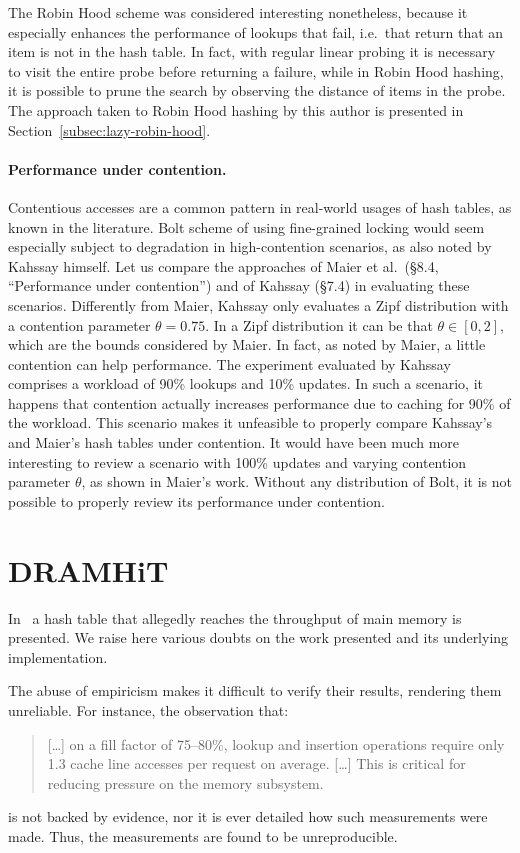 The Robin Hood scheme was considered interesting nonetheless, because it especially enhances the performance of lookups that fail, i.e.\ that return that an item is not in the hash table.
In fact, with regular linear probing it is necessary to visit the entire probe before returning a failure, while in Robin Hood hashing, it is possible to prune the search by observing the distance of items in the probe.
The approach taken to Robin Hood hashing by this author is presented in Section~\ref{subsec:lazy-robin-hood}.

\paragraph{Performance under contention.}
Contentious accesses are a common pattern in real-world usages of hash tables, as known in the literature.
Bolt scheme of using fine-grained locking would seem especially subject to degradation in high-contention scenarios, as also noted by Kahssay himself.
Let us compare the approaches of Maier et al.\ (\S8.4, ``Performance under contention'') and of Kahssay (\S7.4) in evaluating these scenarios.
Differently from Maier, Kahssay only evaluates a Zipf distribution with a contention parameter $\theta = 0.75$.
In a Zipf distribution it can be that $\theta \in [0, 2]$, which are the bounds considered by Maier.
In fact, as noted by Maier, a little contention can help performance.
The experiment evaluated by Kahssay comprises a workload of 90\% lookups and 10\% updates.
In such a scenario, it happens that contention actually increases performance due to caching for 90\% of the workload.
This scenario makes it unfeasible to properly compare Kahssay's and Maier's hash tables under contention.
It would have been much more interesting to review a scenario with 100\% updates and varying contention parameter $\theta$, as shown in Maier's work.
Without any distribution of Bolt, it is not possible to properly review its performance under contention.


\section{DRAMHiT}\label{sec:dramhit}

In~\cite{dramhit} a hash table that allegedly reaches the throughput of main memory is presented.
We raise here various doubts on the work presented and its underlying implementation.

The abuse of empiricism makes it difficult to verify their results, rendering them unreliable.
For instance, the observation that:
\begin{quote}
	[\ldots] on a fill factor of 75--80\%, lookup and insertion operations require only 1.3 cache line accesses per request on average.
	[\ldots] This is critical for reducing pressure on the memory subsystem.
\end{quote}
is not backed by evidence, nor it is ever detailed how such measurements were made.
Thus, the measurements are found to be unreproducible.

